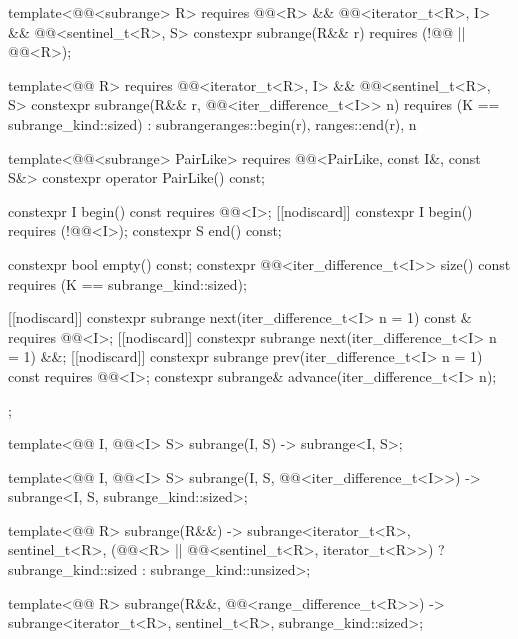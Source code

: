 \begin{codeblock}
{{    template<@@<subrange> R>
      requires @@<R> &&
               @@<iterator_t<R>, I> &&
               @@<sentinel_t<R>, S>
    constexpr subrange(R&& r) requires (!@@ || @@<R>);

    template<@@ R>
      requires @@<iterator_t<R>, I> &&
               @@<sentinel_t<R>, S>
    constexpr subrange(R&& r, @@<iter_difference_t<I>> n)
      requires (K == subrange_kind::sized)
        : subrange{ranges::begin(r), ranges::end(r), n} {}

    template<@@<subrange> PairLike>
      requires @@<PairLike, const I&, const S&>
    constexpr operator PairLike() const;

    constexpr I begin() const requires @@<I>;
    [[nodiscard]] constexpr I begin() requires (!@@<I>);
    constexpr S end() const;

    constexpr bool empty() const;
    constexpr @@<iter_difference_t<I>> size() const
      requires (K == subrange_kind::sized);

    [[nodiscard]] constexpr subrange next(iter_difference_t<I> n = 1) const &
      requires @@<I>;
    [[nodiscard]] constexpr subrange next(iter_difference_t<I> n = 1) &&;
    [[nodiscard]] constexpr subrange prev(iter_difference_t<I> n = 1) const
      requires @@<I>;
    constexpr subrange& advance(iter_difference_t<I> n);
  };

  template<@@ I, @@<I> S>
    subrange(I, S) -> subrange<I, S>;

  template<@@ I, @@<I> S>
    subrange(I, S, @@<iter_difference_t<I>>) ->
      subrange<I, S, subrange_kind::sized>;

  template<@@ R>
    subrange(R&&) ->
      subrange<iterator_t<R>, sentinel_t<R>,
               (@@<R> || @@<sentinel_t<R>, iterator_t<R>>)
                 ? subrange_kind::sized : subrange_kind::unsized>;

  template<@@ R>
    subrange(R&&, @@<range_difference_t<R>>) ->
      subrange<iterator_t<R>, sentinel_t<R>, subrange_kind::sized>;
}
\end{codeblock}

